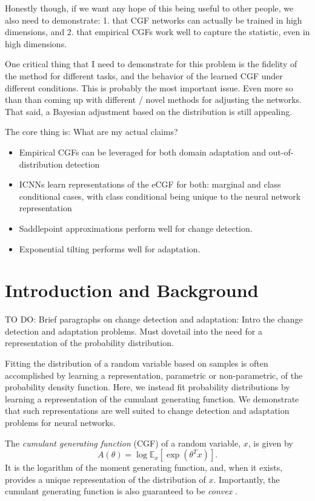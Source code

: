 \documentclass{article}      %
\begin{document}
Honestly though, if we want any hope of this being useful to other people, we also need to demonstrate: 1. that CGF networks can actually be trained in high dimensions, and 2. that empirical CGFs work well to capture the statistic, even in high dimensions.

One critical thing that I need to demonstrate for this problem is the fidelity of the method for different tasks, and the behavior of the learned CGF under different conditions. 
This is probably the most important issue. Even more so than than coming up with different / novel methods for adjusting the networks. That said, a Bayesian adjustment based on the distribution is still appealing.


The core thing is: What are my actual claims?
\begin{itemize}
  \item Empirical CGFs can be leveraged for both domain adaptation and out-of-distribution detection
  \item ICNNs learn representations of the eCGF for both: marginal and class conditional cases, with class conditional being unique to the neural network representation
  \item Saddlepoint approximations perform well for change detection.
  \item Exponential tilting performs well for adaptation.
\end{itemize}





\section{Introduction and Background}


TO DO: Brief paragraphs on change detection and adaptation: Intro the change detection and adaptation problems.
Must dovetail into the need for a representation of the probability distribution.


Fitting the distribution of a random variable based on samples is often accomplished by learning a representation, parametric or non-parametric, of the probability density function.
Here, we instead fit probability distributions by learning a representation of the cumulant generating function.
We demonstrate that such representations are well suited to change detection and adaptation problems for neural networks.

The \textit{cumulant generating function} (CGF) of a random variable, $x$, is given by
\begin{equation}
  A(\theta) = \log \mathbb{E}_x[\exp(\theta^T x)]. \label{def:cgf}
\end{equation}
It is the logarithm of the moment generating function, and, when it exists, provides a unique representation of the distribution of $x$.
Importantly, the cumulant generating function is also guaranteed to be \textit{convex} \cite{barndorff2014information}.
\end{document}
